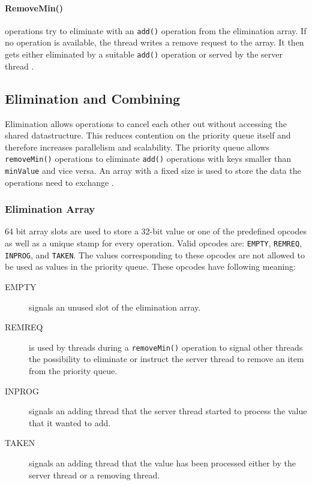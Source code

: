 \paragraph{RemoveMin()}

operations try to eliminate with an \texttt{add()} operation from the elimination array. If no operation is available, the thread writes a remove request to the array. It then gets either eliminated by a suitable \texttt{add()} operation or served by the server thread \cite{calciu_adaptive_2014}.

\subsection{Elimination and Combining}

Elimination allows operations to cancel each other out without accessing the shared datastructure. This reduces contention on the priority queue itself and therefore increases parallelism and scalability. The priority queue allows \texttt{removeMin()} operations to eliminate \texttt{add()} operations with keys smaller than \texttt{minValue} and vice versa. An array with a fixed size is used to store the data the operations need to exchange \cite{calciu_adaptive_2014}.

\subsubsection{Elimination Array}
\label{sec:eliminationArray}

64 bit array slots are used to store a 32-bit value or one of the predefined opcodes as well as a unique stamp for every operation. Valid opcodes are: \texttt{EMPTY}, \texttt{REMREQ}, \texttt{INPROG}, and \texttt{TAKEN}. The values corresponding to these opcodes are not allowed to be used as values in the priority queue. These opcodes have following meaning:

\begin{description}
	\item[EMPTY] signals an unused slot of the elimination array.
	\item[REMREQ] is used by threads during a \texttt{removeMin()} operation to signal other threads the possibility to eliminate or instruct the server thread to remove an item from the priority queue.
	\item[INPROG] signals an adding thread that the server thread started to process the value that it wanted to add.
	\item[TAKEN] signals an adding thread that the value has been processed either by the server thread or a removing thread.
\end{description}

